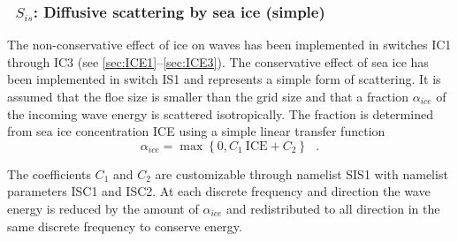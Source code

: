 \vsssub
\subsubsection{~$S_{is}$: Diffusive scattering by sea ice (simple)} \label{sec:IS1}
\vsssub


\noindent
The non-conservative effect of ice on waves has been implemented in switches
{\code IC1} through {\code IC3} (see \para\ref{sec:ICE1}--\ref{sec:ICE3}). The
conservative effect of sea ice has been implemented in switch {\code IS1} and
represents a simple form of scattering. It is assumed that the floe size is
smaller than the grid size and that a fraction $\alpha_{ice}$ of the incoming
wave energy is scattered isotropically. The fraction is determined from sea ice
concentration ICE using a simple linear transfer function
\begin{equation}\label{eq:IS101}
     \alpha_{ice} = \max\left \{0 , C_1\ \mathrm{ICE} + C_2 \right \} \:\:\: .
\end{equation}

\noindent
The coefficients $C_1$ and $C_2$ are customizable through namelist {\F SIS1}
with namelist parameters {\code ISC1} and {\code ISC2}. At each discrete
frequency and direction the wave energy is reduced by the amount of
$\alpha_{ice}$ and redistributed to all direction in the same discrete
frequency to conserve energy.


